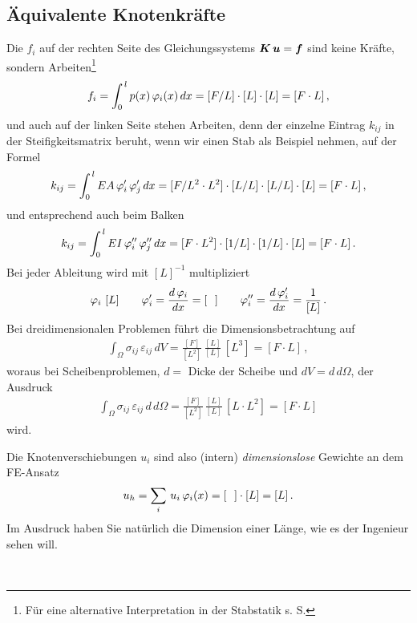 {\textcolor{sectionTitleBlue}{\section{\"{A}quivalente Knotenkr\"{a}fte}}}
Die $f_i $ auf der rechten Seite des Gleichungssystems $\mbox{\boldmath $K$}\,\mbox{\boldmath $u$} = \mbox{\boldmath $f$} $ sind keine Kr\"{a}fte, sondern Arbeiten\footnote{F\"{u}r eine alternative Interpretation in der Stabstatik s. S. \pageref{Dimensionsbetrachtung}}
\begin{align}
f_i = \int_0^{\,l} p(x)\,\varphi_i(x)\,dx = [F/L] \cdot [L] \cdot [L] = [F \cdot L]\,,
\end{align}
und auch auf der linken Seite stehen Arbeiten, denn der einzelne Eintrag $k_{ij}$ in der Steifigkeitsmatrix beruht, wenn wir einen Stab als Beispiel nehmen, auf der Formel
\begin{align}
k_{ij } = \int_0^{\,l} EA\,\varphi_i'\,\varphi_j'\,dx = [F/L^2 \cdot L^2] \cdot [L/L] \cdot [L/L] \cdot [L] = [F \cdot L]\,,
\end{align}
und entsprechend auch beim Balken
\begin{align}
k_{ij } = \int_0^{\,l} EI\,\varphi_i''\,\varphi_j''\,dx = [F \cdot L^2] \cdot [1/L] \cdot [1/L] \cdot [L] = [F \cdot L]\,.
\end{align}
Bei jeder Ableitung wird mit $[L]^{-1}$ multipliziert
\begin{align}
\varphi_i\,\,[L] \qquad \varphi_i' = \frac{d\,\varphi_i}{dx} = [\phantom{L}] \qquad \varphi_i'' = \frac{d\,\varphi_i'}{dx} = \frac{1}{[L]}\,.
\end{align}
Bei dreidimensionalen Problemen f\"{u}hrt die Dimensionsbetrachtung auf
\begin{align}
\int_{\Omega} \sigma_{ij}\,\varepsilon_{ij} \,dV = \frac{[F]}{[L^2]}\,\frac{[L]}{[L]} \,[L^3] = [F \cdot L]\,,
\end{align}
woraus bei Scheibenproblemen, $d = $ Dicke der Scheibe und $ dV = d\, d\Omega$, der Ausdruck
\begin{align}
\int_{\Omega} \sigma_{ij}\,\varepsilon_{ij}\, d \,d\Omega = \frac{[F]}{[L^2]}\,\frac{[L]}{[L]} \,[L \cdot L^2] = [F \cdot L]
\end{align}
wird.\\

\hspace*{-12pt}\colorbox{highlightBlue}{\parbox{0.98\textwidth}{Die Knotenverschiebungen $u_i$ sind also (intern) {\em dimensionslose\/} Gewichte an dem FE-Ansatz
\begin{align}
u_h = \sum_i\,u_i\,\varphi_i(x) = [\phantom{L}] \cdot [L] = [L]\,.
\end{align}
Im Ausdruck haben Sie nat\"{u}rlich die Dimension einer L\"{a}nge, wie es der Ingenieur sehen will.
}}\\

